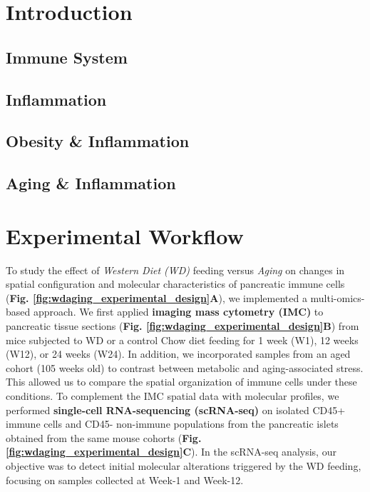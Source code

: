 


\section{Introduction}
\label{sec:endodiff_intro}

\subsection{Immune System}
\subsection{Inflammation}
\subsection{Obesity \& Inflammation}
\subsection{Aging \& Inflammation}


\newpage

\section{Experimental Workflow}
\label{sec:endodiff_summary}

To study the effect of \textit{Western Diet (WD)} feeding versus \textit{Aging} on changes in spatial configuration and molecular characteristics of pancreatic immune cells (\textbf{Fig. \ref{fig:wdaging_experimental_design}A}), we implemented a multi-omics-based approach. We first applied \textbf{imaging mass cytometry (IMC)} to pancreatic tissue sections (\textbf{Fig. \ref{fig:wdaging_experimental_design}B}) from mice subjected to WD or a control Chow diet feeding for 1 week (W1), 12 weeks (W12), or 24 weeks (W24). In addition, we incorporated samples from an aged cohort (105 weeks old) to contrast between metabolic and aging-associated stress. This allowed us to compare the spatial organization of immune cells under these conditions. To complement the IMC spatial data with molecular profiles, we performed \textbf{single-cell RNA-sequencing (scRNA-seq)} on isolated CD45+ immune cells and CD45- non-immune populations from the pancreatic islets obtained from the same mouse cohorts (\textbf{Fig. \ref{fig:wdaging_experimental_design}C}). In the scRNA-seq analysis, our objective was to detect initial molecular alterations triggered by the WD feeding, focusing on samples collected at Week-1 and Week-12.  



